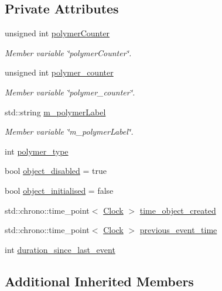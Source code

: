 \subsection*{Private Attributes}
\begin{DoxyCompactItemize}
\item 
unsigned int \mbox{\hyperlink{classPolymer_a4687ca9273a4c34b5f32ab840d8cbf0d}{polymer\+Counter}}
\begin{DoxyCompactList}\small\item\em Member variable \char`\"{}polymer\+Counter\char`\"{}. \end{DoxyCompactList}\item 
unsigned int \mbox{\hyperlink{classPolymer_ac7b32509637c2164757728dbefd2ad77}{polymer\+\_\+counter}}
\begin{DoxyCompactList}\small\item\em Member variable \char`\"{}polymer\+\_\+counter\char`\"{}. \end{DoxyCompactList}\item 
std\+::string \mbox{\hyperlink{classPolymer_a8073d0650f9343960d4b199fb98640e3}{m\+\_\+polymer\+Label}}
\begin{DoxyCompactList}\small\item\em Member variable \char`\"{}m\+\_\+polymer\+Label\char`\"{}. \end{DoxyCompactList}\item 
int \mbox{\hyperlink{classPolymer_afc5e38aa165f2e18ec1eac442edfaf90}{polymer\+\_\+type}}
\item 
bool \mbox{\hyperlink{classPolymer_a07ca6a3ab8d562229090657c3862d140}{object\+\_\+disabled}} = true
\item 
bool \mbox{\hyperlink{classPolymer_a88ec0b2b21fb475cc4de108d2e17cff9}{object\+\_\+initialised}} = false
\item 
std\+::chrono\+::time\+\_\+point$<$ \mbox{\hyperlink{universe_8h_a0ef8d951d1ca5ab3cfaf7ab4c7a6fd80}{Clock}} $>$ \mbox{\hyperlink{classPolymer_a7c6e20b697e1e0dade7158db402e6e4f}{time\+\_\+object\+\_\+created}}
\item 
std\+::chrono\+::time\+\_\+point$<$ \mbox{\hyperlink{universe_8h_a0ef8d951d1ca5ab3cfaf7ab4c7a6fd80}{Clock}} $>$ \mbox{\hyperlink{classPolymer_ab96f5cc44ebcf5edbe7ddad9bc553cf7}{previous\+\_\+event\+\_\+time}}
\item 
int \mbox{\hyperlink{classPolymer_ab78fb6d122f0f8991477ca29d9cf1183}{duration\+\_\+since\+\_\+last\+\_\+event}}
\end{DoxyCompactItemize}
\subsection*{Additional Inherited Members}


